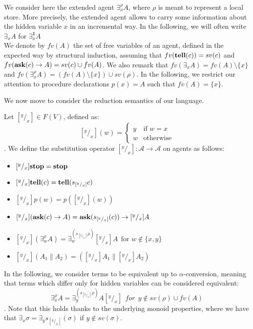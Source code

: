 \documentclass{llncs}
\newcommand{\tell}{{\bf tell}}
\newcommand{\ask}{{\bf ask}}
\newcommand{\ostop}{{\bf stop}}
\newcommand{\rarrow}{\rightarrow}
\def\monid{{\mathbf 0}}
\def\monid{\mathbf{1}}
\begin{document}
We consider here the extended agent $\exists^{\rho}_x A$, where $\rho$ is meant to represent a local store. More precisely, the extended agent allows to carry some information about the hidden variable $x$ in an incremental way. In the following, we will often write $\exists_x A$ for $\exists^{\monid}_x A$ \\
We denote by $fv(A)$ the set of free variables of an agent, defined in the expected way 
by structural induction, assuming that $fv(\tell(c)) = sv(c)$ and
$fv(\ask(c) \rightarrow A) = sv(c) \cup fv(A)$. We also remark that $fv(\exists_x A) = fv(A) \setminus 
\{x\}$ and $fv(\exists^{\rho}_x A) = (fv(A) \setminus \{x\}) \cup sv(\rho)$.
%
In the following, we restrict our attention to 
procedure declarations $p(x) = A$ such that $fv(A) = \{x\}$.

We now move to consider the reduction semantics of our language.

\begin{definition}[Substitutions]
Let $[^y/_x] \in F(V)$, defined as: 
\[ [^y/_x](w) = 
		\begin{cases} 
			y & \text{if $w = x$} \\
            w & \text{otherwise}
        \end{cases} \].
We define the substitution operator $[^y/_x]: \mathcal{A} \rarrow \mathcal{A}$ on agents as follows: 

\begin{itemize}
	\item $[^y/_x] \ostop = \ostop$
	\item $[^y/_x] \tell(c) = \tell(s_{[^y/_x]}c)$
	\item $[^y/_x] p(w) =  p([^y/_x](w))$
	\item $[^y/_x] (\ask(c) \rightarrow A) = \ask(s_{[^y/_x]}(c)) \rightarrow [^y/_x] A$
    \item $[^y/_x] (\exists^{\rho}_w A) = \exists^{(s_{[^y/_x]} \rho)}_w [^y/_x]A \ \
    \text{for $w \not \in \{x, y\}$}$
	\item $[^y/_x](A_1 \parallel A_2)  = ([^y/_x] A_1 \parallel [^y/_x] A_2)$
\end{itemize}
\end{definition}

\begin{remark}
In the following, we consider terms to be equivalent up to $\alpha$-conversion, meaning that terms which differ only for hidden variables can be considered equivalent:
\[\exists_x^\rho A = \exists_y^{(s_{[^y/_x]}\rho)} A [^y/_x] \ \ for \ \ y \not \in sv(\rho) \cup fv(A)\].
Note that this holds thanks to the underlying monoid properties, where we have that $\exists_x \sigma = \exists_y s_{[^y/_x]}(\sigma)$ if $y \not \in sv(\sigma)$.
\end{remark}
\end{document}
